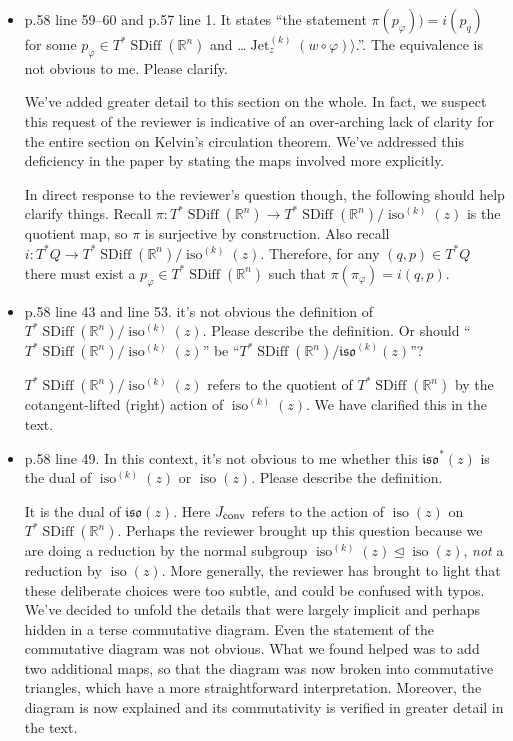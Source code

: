 \documentclass{article}
\def\R{\mathbb{R} }
\def\R{\mathbb{R} }
\DeclareMathOperator{\SDiff}{SDiff}
\DeclareMathOperator{\Jet}{Jet}
\DeclareMathOperator{\iso}{iso}
\begin{document}
\begin{itemize}
\item p.58 line 59--60 and p.57 line 1. It states ``the statement
  $\pi(p_\varphi)) = i(p_q)$ for some $p_\varphi \in T^*\SDiff(\R^n)$
  and \ldots $\Jet_z^{(k)}(w \circ \varphi)\rangle$.''.
  The equivalence is not obvious to me. Please clarify.
  
We've added greater detail to this section on the whole.
In fact, we suspect this request of the reviewer is indicative of an over-arching lack of clarity for the entire section on Kelvin's circulation theorem.
We've addressed this deficiency in the paper by stating the maps involved more explicitly.

In direct response to the reviewer's question though, the following should help clarify things.
Recall $\pi: T^*\SDiff(\R^n) \to T^*\SDiff(\R^n) / \iso^{(k)}(z)$ is the quotient map, so $\pi$ is surjective by construction.
Also recall $i: T^*Q \to T^*\SDiff(\R^n) / \iso^{(k)}(z)$.
Therefore, for any $(q,p) \in T^*Q$ there must exist a $p_\varphi \in T^* \SDiff(\R^n)$ such that $\pi( \pi_\varphi) = i(q,p)$.

\item p.58 line 43 and line 53. it's not obvious the definition of
  $T^*\SDiff(\R^n)/\iso^{(k)}(z)$.
  Please describe the definition. Or should
  ``$T^*\SDiff(\R^n)/\iso^{(k)}(z)$''
  be ``$T^*\SDiff(\R^n)/\mathfrak{iso}^{(k)}(z)$''?

  $T^*\SDiff(\R^n) / \iso^{(k)}(z)$ refers to the quotient of $T^*\SDiff(\R^n)$
  by the cotangent-lifted (right) action of
  $\iso^{(k)}(z)$. We have clarified this in the text.

\item p.58 line 49. In this context, it's not obvious to me whether
  this $\mathfrak{iso}^*(z)$ is the dual of $\iso^{(k)}(z)$ or
  $\iso(z)$. Please describe the definition.

  It is the dual of $\mathfrak{iso}(z)$.
  Here $J_{\rm conv}$ refers to the action of $\iso(z)$ on $T^* \SDiff(\R^n)$.
  Perhaps the reviewer brought up this question because we are doing a reduction by the normal subgroup $\iso^{(k)}(z) \trianglelefteq \iso(z)$, \emph{not} a reduction by $\iso(z)$.
  More generally, the reviewer has brought to light that these deliberate choices were too subtle, and could be confused with typos.
  We've decided to unfold the details that were largely implicit and perhaps hidden in a terse commutative diagram.
  Even the statement of the commutative diagram was not obvious.
  What we found helped was to add two additional maps, so that the diagram was now broken into commutative triangles, which have a more straightforward interpretation.
  Moreover, the diagram is now explained and its commutativity is verified in greater detail in the text.


\end{itemize}
\end{document}
